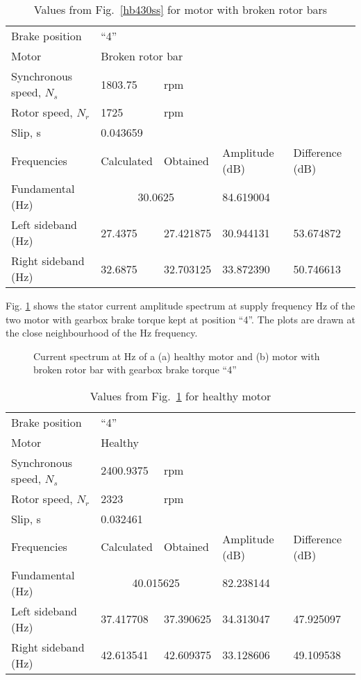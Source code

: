 \documentclass[a4paper,11pt]{report}
\begin{document}
\begin{table}[h]
\centering
\begin{tabular}{lllll}
Brake position	& ``4'' & & & \\			
Motor &	\multicolumn{4}{l}{Broken rotor	bar} \\ 
Synchronous speed, $N_{s}$	& 1803.75	& rpm & & \\			
Rotor speed, $N_{r}$ 	  	& 1725	& rpm& & \\		
Slip, s			  	&  \multicolumn{4}{l}{0.043659} \\			
Frequencies 		  	& Calculated & Obtained & Amplitude (dB) & Difference (dB) \\
Fundamental (Hz)		& \multicolumn{2}{c}{30.0625}& 84.619004 &  \\ 
Left sideband (Hz) 		& 27.4375 & 27.421875 & 30.944131 & 53.674872 \\
Right sideband (Hz)		& 32.6875 & 32.703125 & 33.872390 & 50.746613 
\end{tabular}
\caption{Values from Fig.~\ref{hb430ss} for motor with broken rotor bars} \label{b430sst}
\end{table}

\clearpage
Fig. \ref{hb440ss} shows the stator current amplitude spectrum at supply frequency \unit[40]{Hz} of the two motor with gearbox brake torque kept at position ``4''. The plots are drawn at the close neighbourhood of the \unit[40]{Hz} frequency.

\begin{figure}[htbp]
\centering
\subfigure[]{\texttt{[image: h440]}}
\subfigure[]{\texttt{[image: b440]}}
\caption{Current spectrum at \unit[40]{Hz} of a (a) healthy motor and (b) motor with broken rotor bar with gearbox brake torque ``4''} \label{hb440ss}
\end{figure}

\begin{table}[h]
\centering
\begin{tabular}{lllll}
Brake position	& ``4'' & & & \\			
Motor &	\multicolumn{4}{l}{Healthy} \\ 
Synchronous speed, $N_{s}$	&2400.9375 & rpm & & \\			
Rotor speed, $N_{r}$ 	  	& 2323	& rpm& & \\		
Slip, s			  	&  \multicolumn{4}{l}{0.032461} \\			
Frequencies 		  	& Calculated & Obtained & Amplitude (dB) & Difference (dB) \\
Fundamental (Hz)		& \multicolumn{2}{c}{40.015625}	& 82.238144 &  \\ 
Left sideband (Hz) 		& 37.417708 & 37.390625 & 34.313047 & 47.925097\\
Right sideband (Hz)		& 42.613541 & 42.609375 & 33.128606 & 49.109538 
\end{tabular}
\caption{Values from Fig.~\ref{hb440ss} for healthy motor} \label{h440sst}
\end{table}
\end{document}
